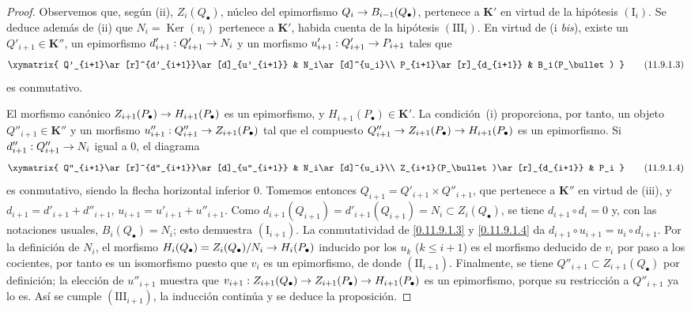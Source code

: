 \documentclass[10pt,oneside,openany]{book}
\theoremstyle{egaenv}\newtheorem*{env}{---}
\theoremstyle{egastatement}
\theoremstyle{egadescription}
\newcommand{\oldpage}[2][]{\marginnote{\normalfont\scriptsize\textbf{#1}\,|\,#2}\ignorespaces}
\renewcommand{\leq}{\leqslant}
\renewcommand{\to}{\mathchoice{\longrightarrow}{\rightarrow}{\rightarrow}{\rightarrow}}
\begin{document}
\begin{proof}
Observemos que, según (ii), $Z_i(Q_\bullet)$, núcleo del epimorfismo $Q_i\to B_{i-1}(Q_\bullet)$, pertenece a $\boldsymbol{K}'$ en virtud de la hipótesis $(\mathrm I_i)$. Se deduce además de (ii) que
$N_i=\operatorname{Ker}(v_i)$
pertenece a $\boldsymbol{K}'$, habida cuenta de la hipótesis $(\mathrm{III}_i)$. En virtud de (i \emph{bis}), existe un $Q'_{i+1}\in\boldsymbol{K}''$, un epimorfismo
$d'_{i+1}:Q'_{i+1}\to N_i$
y un morfismo $u'_{i+1}:Q'_{i+1}\to P_{i+1}$ tales que
\[
\xymatrix{
Q'_{i+1}\ar[r]^{d'_{i+1}}\ar[d]_{u'_{i+1}} &
N_i\ar[d]^{u_i}\\
P_{i+1}\ar[r]_{d_{i+1}} & B_i(P_\bullet)
}
\tag{11.9.1.3}\label{0.11.9.1.3-fr}
\]
es conmutativo.

El morfismo canónico
$Z_{i+1}(P_\bullet)\to H_{i+1}(P_\bullet)$
es un epimorfismo, y $H_{i+1}(P_\bullet)\in\boldsymbol{K}'$.
La condición~(i) proporciona, por tanto, un objeto $Q''_{i+1}\in\boldsymbol{K}''$ y un
morfismo
$u''_{i+1}:Q''_{i+1}\to Z_{i+1}(P_\bullet)$
tal que el compuesto
$Q''_{i+1}\to Z_{i+1}(P_\bullet)\to H_{i+1}(P_\bullet)$
es un epimorfismo.
Si $d''_{i+1}:Q''_{i+1}\to N_i$ igual a $0$, el diagrama
\[
\xymatrix{
Q''_{i+1}\ar[r]^{d''_{i+1}}\ar[d]_{u''_{i+1}} &
N_i\ar[d]^{u_i}\\
Z_{i+1}(P_\bullet)\ar[r]_{d_{i+1}} & P_i
}
\tag{11.9.1.4}\label{0.11.9.1.4-fr}
\]
\oldpage[0\textsubscript{III}]{48}
es conmutativo, siendo la flecha horizontal inferior $0$. Tomemos entonces $Q_{i+1}=Q'_{i+1}\times Q''_{i+1}$, que pertenece a $\boldsymbol{K}''$ en virtud de (iii), y
$d_{i+1}=d'_{i+1}+d''_{i+1}$, $u_{i+1}=u'_{i+1}+u''_{i+1}$.
Como $d_{i+1}(Q_{i+1})=d'_{i+1}(Q_{i+1})=N_i\subset Z_i(Q_\bullet)$, se tiene
$d_{i+1}\circ d_i=0$ y, con las notaciones usuales,
$B_i(Q_\bullet)=N_i$; esto demuestra
$(\mathrm I_{i+1})$.
La conmutatividad de \eqref{0.11.9.1.3} y
\eqref{0.11.9.1.4} da
$d_{i+1}\circ u_{i+1}=u_i\circ d_{i+1}$.
Por la definición de $N_i$, el morfismo
$H_i(Q_\bullet)=Z_i(Q_\bullet)/N_i\to H_i(P_\bullet)$
inducido por los $u_k$ ($k\leq i+1$) es el morfismo deducido de $v_i$ por paso a los cocientes, por tanto es un isomorfismo puesto que $v_i$ es un epimorfismo, de donde $(\mathrm{II}_{i+1})$. Finalmente, se tiene $Q''_{i+1}\subset Z_{i+1}(Q_\bullet)$ por definición; la elección de $u''_{i+1}$ muestra que
$v_{i+1}:Z_{i+1}(Q_\bullet)\to Z_{i+1}(P_\bullet)
\to H_{i+1}(P_\bullet)$
es un epimorfismo, porque su restricción a $Q''_{i+1}$ ya lo
es.
Así se cumple $(\mathrm{III}_{i+1})$, la inducción continúa y se deduce la
proposición.
\end{proof}
\end{document}
